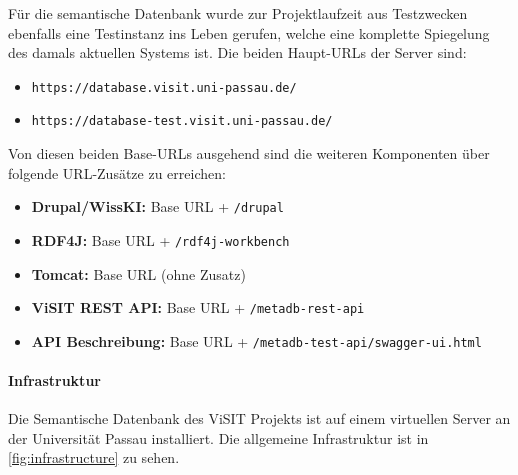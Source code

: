 Für die semantische Datenbank wurde zur Projektlaufzeit aus Testzwecken ebenfalls eine Testinstanz ins Leben gerufen, welche eine komplette Spiegelung des damals aktuellen Systems ist. Die beiden Haupt-URLs der Server sind:

\begin{itemize}
	\item \texttt{https://database.visit.uni-passau.de/}
	\item \texttt{https://database-test.visit.uni-passau.de/}
\end{itemize}

Von diesen beiden Base-URLs ausgehend sind die weiteren Komponenten über folgende URL-Zusätze zu erreichen:

\begin{itemize}
	\item \textbf{Drupal/WissKI:} Base URL + \texttt{/drupal}
	\item \textbf{RDF4J:} Base URL + \texttt{/rdf4j-workbench}
	\item \textbf{Tomcat:} Base URL (ohne Zusatz)
	\item \textbf{ViSIT REST API:} Base URL + \texttt{/metadb-rest-api}
	\item \textbf{API Beschreibung:} Base URL + \texttt{/metadb-test-api/swagger-ui.html}
\end{itemize}

\paragraph{Infrastruktur}

Die Semantische Datenbank des ViSIT Projekts ist auf einem virtuellen Server an der Universität Passau installiert. Die allgemeine Infrastruktur ist in \autoref{fig:infrastructure} zu sehen.

